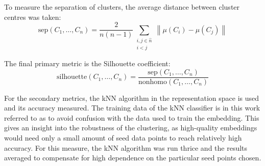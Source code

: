 To measure the separation of clusters, the average distance between cluster centres was taken:
\[ \mathrm{sep} \left( C_1, \dots, C_n \right) = \frac{2}{n \left( n - 1 \right)} \sum_{\substack{i, j \in \hat{n} \\ i < j }} \left\lVert \mu \left( C_i \right) - \mu \left( C_j \right) \right\rVert \]

The final primary metric is the Silhouette coefficient:
\[ \mathrm{silhouette} \left( C_1, \dots, C_n \right) = \frac{\mathrm{sep} \left( C_1, \dots, C_n \right)}{\mathrm{nonhomo} \left( C_1, \dots, C_n \right)} \]

For the secondary metrics, the kNN algorithm in the representation space is used and its accuracy measured. The training data of the kNN classifier is in this work referred to as  to avoid confusion with the data used to train the embedding. This gives an insight into the robustness of the clustering, as high-quality embeddings would need only a small amount of seed data points to reach relatively high accuracy. For this measure, the kNN algorithm was run thrice and the results averaged to compensate for high dependence on the particular seed points chosen.
